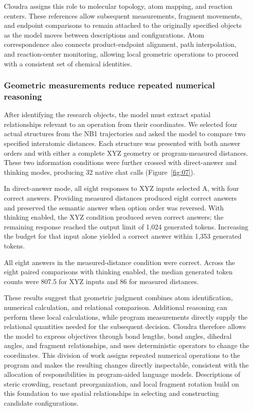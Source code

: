 Cloudra assigns this role to molecular topology, atom mapping, and reaction centers. These references allow subsequent measurements, fragment movements, and endpoint comparisons to remain attached to the originally specified objects as the model moves between descriptions and configurations. Atom correspondence also connects product-endpoint alignment, path interpolation, and reaction-center monitoring, allowing local geometric operations to proceed with a consistent set of chemical identities.





\subsubsection{Geometric measurements reduce repeated numerical reasoning}

After identifying the research objects, the model must extract spatial relationships relevant to an operation from their coordinates. We selected four actual structures from the NB1 trajectories and asked the model to compare two specified interatomic distances. Each structure was presented with both answer orders and with either a complete XYZ geometry or program-measured distances. These two information conditions were further crossed with direct-answer and thinking modes, producing 32 native chat calls (Figure~\ref{fig:07}).

In direct-answer mode, all eight responses to XYZ inputs selected A, with four correct answers. Providing measured distances produced eight correct answers and preserved the semantic answer when option order was reversed. With thinking enabled, the XYZ condition produced seven correct answers; the remaining response reached the output limit of 1,024 generated tokens. Increasing the budget for that input alone yielded a correct answer within 1,353 generated tokens.

All eight answers in the measured-distance condition were correct. Across the eight paired comparisons with thinking enabled, the median generated token counts were 807.5 for XYZ inputs and 86 for measured distances.

These results suggest that geometric judgment combines atom identification, numerical calculation, and relational comparison. Additional reasoning can perform these local calculations, while program measurements directly supply the relational quantities needed for the subsequent decision. Cloudra therefore allows the model to express objectives through bond lengths, bond angles, dihedral angles, and fragment relationships, and uses deterministic operators to change the coordinates. This division of work assigns repeated numerical operations to the program and makes the resulting changes directly inspectable, consistent with the allocation of responsibilities in program-aided language models.\citep{ref15} Descriptions of steric crowding, reactant preorganization, and local fragment rotation build on this foundation to use spatial relationships in selecting and constructing candidate configurations.





